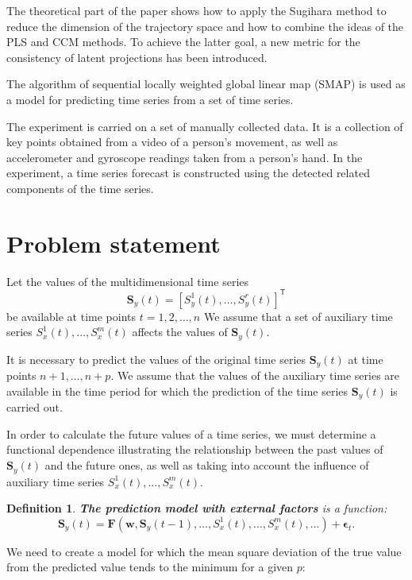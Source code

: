 \documentclass[bst/sn-mathphys]{sn-jnl}%
\newcommand{\bw}{\mathbf{w}}
\newcommand{\bS}{\mathbf{S}}
\newcommand{\bF}{\mathbf{F}}
\renewcommand{\T}{^{\mathsf{T}}}
\theoremstyle{thmstyleone}%
\theoremstyle{thmstyletwo}%
\theoremstyle{thmstylethree}%
\newtheorem{definition}{Definition}%
\begin{document}
The theoretical part of the paper shows how to apply the Sugihara method to reduce the dimension of the trajectory space and how to combine the ideas of the PLS and CCM methods.
To achieve the latter goal, a new metric for the consistency of latent projections has been introduced.

The algorithm of sequential locally weighted global linear map (SMAP) \cite{sugihara1994nonlinear} is used as a model for predicting time series from a set of time series.

The experiment is carried on a set of manually collected data. 
It is a collection of key points obtained from a video of a person's movement, as well as accelerometer and gyroscope readings taken from a person's hand.
In the experiment, a time series forecast is constructed using the detected related components of the time series.

\section{Problem statement}
Let the values of the multidimensional time series 
\[ \bS_y(t) = [S_y^1(t), \ldots, S_y^r(t)] \T \]
be available at time points $t = 1, 2, \ldots, n$
We assume that a set of auxiliary time series $S_x^1(t), \ldots, S_x^m(t)$ affects the values of $\bS_y(t)$.

It is necessary to predict the values of the original time series $\bS_y(t)$ at time points $n+1, \ldots, n+p$.
We assume that the values of the auxiliary time series are available in the time period for which the prediction of the time series $\bS_y(t)$ is carried out.

In order to calculate the future values of a time series, we must determine a functional dependence illustrating the relationship between the past values of $\bS_y(t)$ and the future ones, as well as taking into account the influence of auxiliary time series $S_x^1(t), \ldots, S_x^m(t)$.

\begin{definition}
	\textbf{The prediction model with external factors} is a function:
	\begin{equation*}
		\bS_y(t) = \bF(\bw, \bS_y(t-1), \ldots, S_x^1(t), \ldots, S_x^m(t), \ldots) + \boldsymbol{\epsilon}_t.
	\end{equation*}
\end{definition}

We need to create a model for which the mean square deviation of the true value from the predicted value tends to the minimum for a given $p$:
\end{document}
